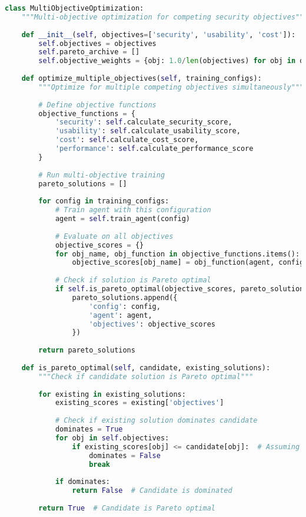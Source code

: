 \documentclass[12pt,a4paper]{article}
\begin{document}
\begin{lstlisting}[language=Python, caption=Novel Research Extensions]
class MultiObjectiveOptimization:
    """Multi-objective optimization for competing security objectives"""
    
    def __init__(self, objectives=['security', 'usability', 'cost']):
        self.objectives = objectives
        self.pareto_archive = []
        self.objective_weights = {obj: 1.0/len(objectives) for obj in objectives}
    
    def optimize_multiple_objectives(self, training_configs):
        """Optimize for multiple competing objectives simultaneously"""
        
        # Define objective functions
        objective_functions = {
            'security': self.calculate_security_score,
            'usability': self.calculate_usability_score,
            'cost': self.calculate_cost_score,
            'performance': self.calculate_performance_score
        }
        
        # Run multi-objective training
        pareto_solutions = []
        
        for config in training_configs:
            # Train agent with this configuration
            agent = self.train_agent(config)
            
            # Evaluate on all objectives
            objective_scores = {}
            for obj_name, obj_function in objective_functions.items():
                objective_scores[obj_name] = obj_function(agent, config)
            
            # Check if solution is Pareto optimal
            if self.is_pareto_optimal(objective_scores, pareto_solutions):
                pareto_solutions.append({
                    'config': config,
                    'agent': agent,
                    'objectives': objective_scores
                })
        
        return pareto_solutions
    
    def is_pareto_optimal(self, candidate, existing_solutions):
        """Check if candidate solution is Pareto optimal"""
        
        for existing in existing_solutions:
            existing_scores = existing['objectives']
            
            # Check if existing solution dominates candidate
            dominates = True
            for obj in self.objectives:
                if existing_scores[obj] <= candidate[obj]:  # Assuming minimization
                    dominates = False
                    break
            
            if dominates:
                return False  # Candidate is dominated
        
        return True  # Candidate is Pareto optimal
\end{lstlisting}
\end{document}
